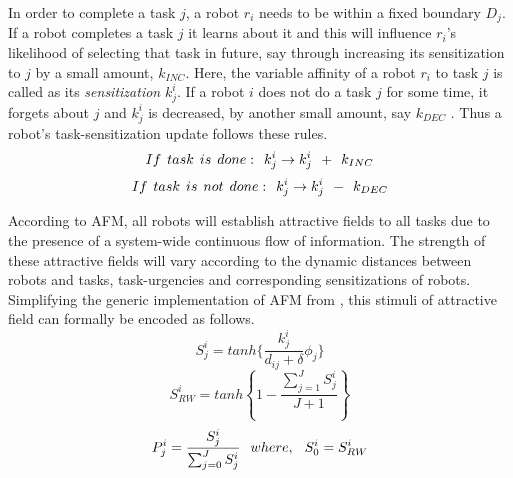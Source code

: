 In order to complete a task $j$, a robot $r_i$ needs to be within a fixed boundary $D_{j}$. If a robot completes a task $j$ it learns about it and this will influence $r_i$'s likelihood of selecting that task in future, say through increasing  its sensitization to $j$ by a small amount, $k_{INC}$. Here, the variable affinity of a robot $r_i$ to task $j$ is called as its {\em sensitization} $k^{i}_{j}$. If a robot $i$ does not do a task $j$ for some time, it forgets about $j$ and $k^i_j$ is decreased, by another small amount, say $k_{DEC}$ .
Thus a robot's task-sensitization update follows these rules.
\begin{equation}
 If\hspace*{0.15cm}task\hspace*{0.15cm}is\hspace*{0.15cm}done:\hspace*{0.15cm}  k^i_j \rightarrow   k^i_j \hspace*{0.15cm} + \hspace*{0.15cm} k_{INC}
\label{eqn:k-inc}
\end{equation}
\begin{equation}
 If\hspace*{0.15cm}task\hspace*{0.15cm}is\hspace*{0.15cm}not\hspace*{0.15cm}done:\hspace*{0.15cm}  k^i_j \rightarrow   k^i_j \hspace*{0.15cm} - \hspace*{0.15cm} k_{DEC}
\label{eqn:k-dec}
\end{equation}

According to AFM, all robots will establish attractive fields to all tasks due to the presence of a system-wide continuous flow of information. The strength of these attractive fields will vary according to the dynamic distances between robots and tasks, task-urgencies and corresponding sensitizations of robots. Simplifying the generic implementation of AFM from ,  this stimuli of attractive field can formally be encoded as follows.
\begin{equation}
S_{j}^{i} = tanh\{\frac{k_{j}^{i}}{d_{ij}+\delta } \phi _{j}\}
\label{eqn:afm1}
\end{equation}
\begin{equation}
S^{i}_{RW} = tanh \left \{ 1 -  \frac{ \sum_{j=1}^{J} S^{i}_{j}}{J + 1} \right \}
\label{eqn:afm2}
\end{equation}
\begin{equation}
P_{j}^{i} = \frac{S_{j}^{i}}{\sum_{j=0}^{J} S_{j}^{i}} \hspace*{0.25cm}where,\hspace*{0.25cm}S^{i}_{0} = S^{i}_{RW}   
\label{eqn:afm3}
\end{equation}

